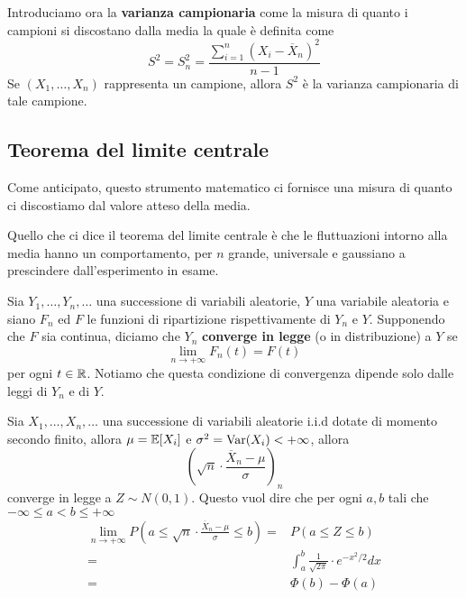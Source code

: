 Introduciamo ora la \textbf{varianza campionaria} come la misura di quanto i campioni si
discostano dalla media la quale è definita come
\[ S^2 = S_n^2 = \frac{\sum_{i=1}^n \left( X_i - \overline{X}_n \right)^2}{n - 1} \]
Se $(X_1, \dots, X_n)$ rappresenta un campione, allora $S^2$ è la varianza campionaria di tale
campione.

\subsection{Teorema del limite centrale}
Come anticipato, questo strumento matematico ci fornisce una misura di quanto ci discostiamo dal
valore atteso della media.

Quello che ci dice il teorema del limite centrale è che le fluttuazioni intorno alla media
hanno un comportamento, per $n$ grande, universale e gaussiano a prescindere dall'esperimento in
esame.

\begin{definition}
	Sia $Y_1, \dots, Y_n, \dots$ una successione di variabili aleatorie, $Y$ una variabile
	aleatoria e siano $F_n$ ed $F$ le funzioni di ripartizione rispettivamente di $Y_n$ e $Y$.
	Supponendo che $F$ sia continua, diciamo che $Y_n$ \textbf{converge in legge} (o in
	distribuzione) a $Y$ se
	\[ \lim_{n \to +\infty} F_n (t) = F(t) \]
	per ogni $t \in \mathbb{R}$. Notiamo che questa condizione di convergenza dipende solo dalle leggi di
	$Y_n$ e di $Y$.
\end{definition}

\begin{theorem}\label{th: tlc}
	Sia $X_1, \dots, X_n, \dots$ una successione di variabili aleatorie i.i.d dotate di momento
	secondo finito, allora $\mu = \mathbb{E}[X_i]$ e $\sigma^2 = \operatorname{Var}(X_i) < +\infty$, allora
	\[ \left( \sqrt{n} \cdot \frac{\overline{X}_n - \mu}{\sigma} \right)_n \]
	converge in legge a $Z \sim N(0,1)$. Questo vuol dire che per ogni $a, b$ tali che
	$-\infty \leq a < b \leq +\infty$
	\begin{align*}
		\lim_{n \to +\infty} P\left( a \leq \sqrt{n} \cdot \frac{\overline{X}_n - \mu}{\sigma}
		\leq b \right) = & P(a \leq Z \leq b)                                      \\
		=                & \int_{a}^{b} \frac{1}{\sqrt{2 \pi}} \cdot e^{-x^2/2} dx \\
		=                & \Phi(b) - \Phi(a)
	\end{align*}
\end{theorem}

